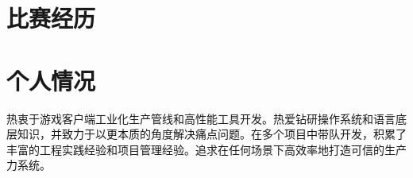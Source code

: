\documentclass[10pt,a4paper,sans]{moderncv}
\begin{document}
\section{比赛经历}

\section{个人情况}
热衷于游戏客户端工业化生产管线和高性能工具开发。热爱钻研操作系统和语言底层知识，并致力于以更本质的角度解决痛点问题。在多个项目中带队开发，积累了丰富的工程实践经验和项目管理经验。追求在任何场景下高效率地打造可信的生产力系统。
\end{document}
